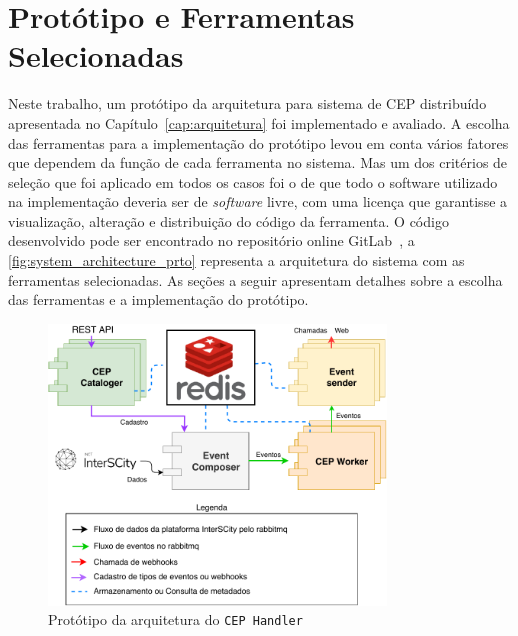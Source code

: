 \chapter{Protótipo e Ferramentas Selecionadas}
\label{cap:prototype}






Neste trabalho, um protótipo da arquitetura para sistema de CEP distribuído apresentada no Capítulo~\ref{cap:arquitetura} foi implementado e avaliado. 
A escolha das ferramentas para a implementação do protótipo levou em conta vários fatores que dependem da função de cada ferramenta no sistema. Mas um dos critérios de seleção que foi aplicado em todos os casos foi o de que todo o software utilizado na implementação deveria ser de \textit{software} livre, com uma licença que garantisse a visualização,  alteração e distribuição do código da ferramenta. O código desenvolvido pode ser encontrado no repositório online GitLab~\citep{CEPHandler}, a \autoref{fig:system_architecture_prto} representa a arquitetura do sistema com as ferramentas selecionadas.
As seções a seguir apresentam detalhes sobre a escolha das ferramentas e a implementação do protótipo.


\begin{figure}[hb!]
      \centering
      \includegraphics[width=0.8\textwidth]{figuras/graphics/prot_dia.pdf}
      \caption{Protótipo da arquitetura do \texttt{CEP Handler}}
      \label{fig:system_architecture_prto}
\end{figure}

